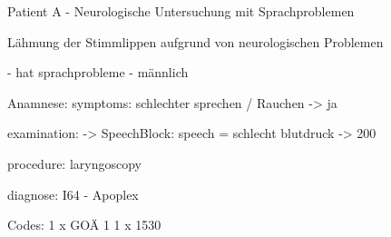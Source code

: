 Patient A - Neurologische Untersuchung mit Sprachproblemen

Lähmung der Stimmlippen aufgrund von neurologischen Problemen

- hat sprachprobleme
- männlich


Anamnese:
symptoms: schlechter sprechen /
Rauchen -> ja

examination:
-> SpeechBlock: speech = schlecht
blutdruck -> 200

procedure:
laryngoscopy

diagnose: I64 - Apoplex

Codes:
1 x GOÄ 1
1 x 1530
